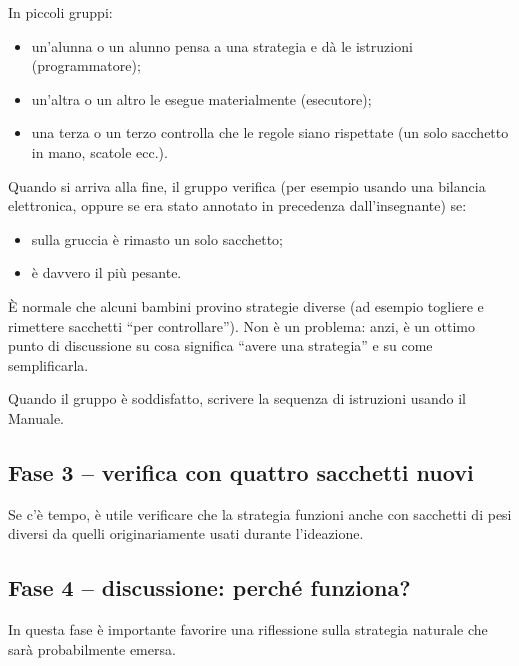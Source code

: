 In piccoli gruppi:

\begin{itemize}
\item
  un'alunna o un alunno pensa a una strategia e dà le istruzioni (programmatore);
\item
  un'altra o un altro le esegue materialmente (esecutore);
\item
  una terza o un terzo controlla che le regole siano rispettate (un solo sacchetto in mano, scatole ecc.).
\end{itemize}

Quando si arriva alla fine, il gruppo verifica (per esempio usando una bilancia elettronica, oppure se era stato annotato in precedenza dall'insegnante) se:

\begin{itemize}
\item
  sulla gruccia è rimasto un solo sacchetto;
\item
  è davvero il più pesante.
\end{itemize}

\begin{attenzione}\label{aspetto-a-cui-fare-attenzione-5}


È normale che alcuni bambini provino strategie diverse (ad esempio togliere e rimettere sacchetti ``per controllare''). Non è un problema: anzi, è un ottimo punto di discussione su cosa significa ``avere una strategia'' e su come semplificarla.
\end{attenzione}

Quando il gruppo è soddisfatto, scrivere la sequenza di istruzioni usando il Manuale.

\subsection{Fase 3 -- verifica con quattro sacchetti nuovi }\label{fase-3-verifica-con-quattro-sacchetti-nuovi}

Se c'è tempo, è utile verificare che la strategia funzioni anche con sacchetti di pesi diversi da quelli originariamente usati durante l'ideazione.


\subsection{Fase 4 -- discussione: perché funziona?}


In questa fase è importante favorire una riflessione sulla strategia naturale che sarà probabilmente emersa.


